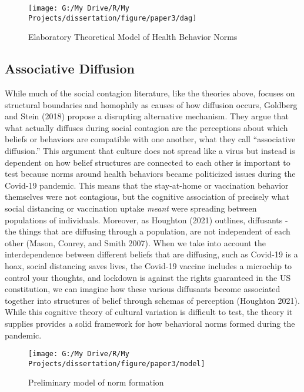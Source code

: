 \begin{figure}

{\centering \texttt{[image: G:/My Drive/R/My Projects/dissertation/figure/paper3/dag]} 

}

\caption{Elaboratory Theoretical Model of Health Behavior Norms}\label{fig:dag}
\end{figure}

\hypertarget{associative-diffusion}{%
\subsection{Associative Diffusion}\label{associative-diffusion}}

While much of the social contagion literature, like the theories above, focuses
on structural boundaries and homophily as causes of how diffusion occurs,
Goldberg and Stein (2018) propose a
disrupting alternative mechanism. They argue that what actually diffuses during
social contagion are the perceptions about which beliefs or behaviors are
compatible with one another, what they call ``associative diffusion.'' This
argument that culture does not spread like a virus but instead is dependent on
how belief structures are connected to each other is important to test because
norms around health behaviors became politicized issues during the Covid-19
pandemic. This means that the stay-at-home or vaccination behavior themselves
were not contagious, but the cognitive association of precisely what social
distancing or vaccination uptake \emph{meant} were spreading between populations of
individuals. Moreover, as Houghton (2021) outlines, diffusants - the things that are
diffusing through a population, are not independent of each other
(Mason, Conrey, and Smith 2007). When we take into account the interdependence between different
beliefs that are diffusing, such as Covid-19 is a hoax, social distancing saves
lives, the Covid-19 vaccine includes a microchip to control your thoughts, and lockdown
is against the rights guaranteed in the US constitution, we can imagine how
these various diffusants become associated together into structures of belief
through schemas of perception (Houghton 2021). While this cognitive theory of
cultural variation is difficult to test, the theory it supplies provides a solid
framework for how behavioral norms formed during the pandemic.

\begin{figure}

{\centering \texttt{[image: G:/My Drive/R/My Projects/dissertation/figure/paper3/model]} 

}

\caption{Preliminary model of norm formation}\label{fig:norm-framework}
\end{figure}

